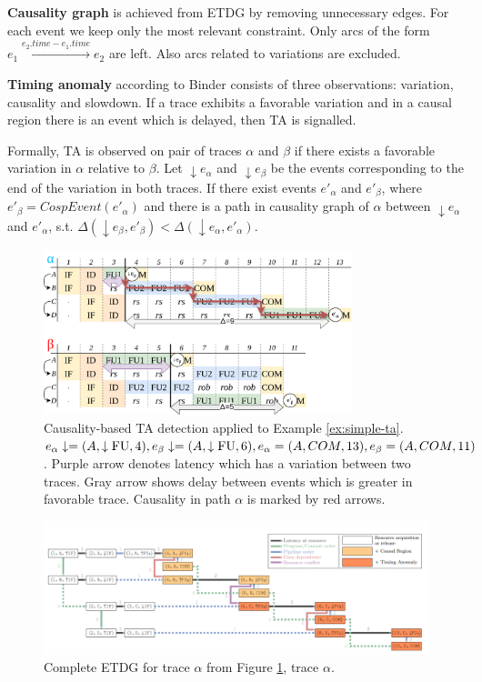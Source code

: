 \textbf{Causality graph} is achieved from ETDG by removing unnecessary edges. For each event we keep only the most relevant constraint. Only arcs of the form $e_1 \xrightarrow{e_2.time - e_1.time} e_2$ are left. Also arcs related to variations are excluded.

\textbf{Timing anomaly} according to Binder consists of three observations: variation, causality and slowdown. If a trace exhibits a favorable variation and in a causal region there is an event which is delayed, then TA is signalled.

Formally, TA is observed on pair of traces $\alpha$ and $\beta$ if there exists a favorable variation in $\alpha$ relative to $\beta$. Let $\downarrow e_\alpha$ and $\downarrow e_\beta$ be the events corresponding to the end of the variation in both traces. If there exist events $e'_\alpha$ and $e'_\beta$, where $e'_\beta = CospEvent(e'_\alpha)$ and there is a path in causality graph of $\alpha$ between $\downarrow e_\alpha$ and $e'_\alpha$, s.t. $\Delta(\downarrow e_\beta,e'_\beta) < \Delta(\downarrow e_\alpha,e'_\alpha)$.



\begin{figure}[htbp]
    \centering
    \includegraphics[width=0.8\textwidth]{figures/multiscalar_ta_causality.png}
    \caption{Causality-based TA detection applied to Example \ref{ex:simple-ta}. $e_\alpha\downarrow = (A, \downarrow\mathrm{FU}, 4), e_\beta\downarrow = (A, \downarrow\mathrm{FU}, 6), e_\alpha = (A, COM, 13), e_\beta = (A, COM, 11)$. Purple arrow denotes latency which has a variation between two traces. Gray arrow shows delay between events which is greater in favorable trace. Causality in  path $\alpha$ is marked by red arrows.}
    \label{fig:multiscalar-ta-causality}
\end{figure}

\begin{figure}[htbp]
    \centering
    \includegraphics[width=\textwidth]{figures/ETDG.png}
    \caption{Complete ETDG for trace $\alpha$ from Figure \ref{fig:multiscalar-ta-causality}, trace $\alpha$. }
    \label{fig:ETDG}
\end{figure}

